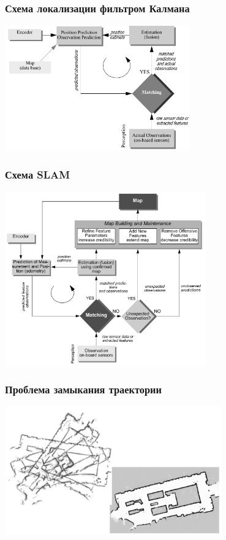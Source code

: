 \documentclass{../../slides-style}
\begin{document}
    \begin{frame}
        \frametitle{Схема локализации фильтром Калмана}
        \begin{center}
            \includegraphics[width=0.6\textwidth]{kalmanLocalization.png}
        \end{center}
    \end{frame}

    \begin{frame}
        \frametitle{Схема SLAM}
        \begin{center}
            \includegraphics[width=0.65\textwidth]{slam.png}
        \end{center}
    \end{frame}

    \begin{frame}
        \frametitle{Проблема замыкания траектории}
        \begin{center}
            \includegraphics[width=0.7\textwidth]{slamErrors.png}
        \end{center}
    \end{frame}
\end{document}
